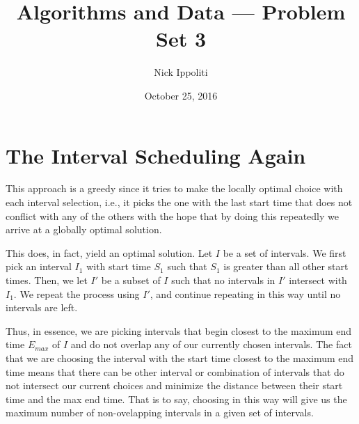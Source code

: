 \documentclass[14pt, letterpaper]{article}
\title{Algorithms and Data --- Problem Set 3}
\author{Nick Ippoliti}
\date{October 25, 2016}
\begin{document}
\begin{titlepage}
\maketitle
\end{titlepage}

\section{The Interval Scheduling Again}
This approach is a greedy since it tries to make the locally optimal choice
with each interval selection, i.e., it picks the one with the last start time
that does not conflict with any of the others with the hope that by doing this
repeatedly we arrive at a globally optimal solution.

This does, in fact, yield an optimal solution. Let $I$ be a set of intervals.
We first pick an interval $I_1$ with start time $S_1$ such that $S_1$ is 
greater than all other start times. Then, we let $I'$ be a subset of $I$ such
that no intervals in $I'$ intersect with $I_1$. We repeat the process using 
$I'$, and continue repeating in this way until no intervals are left.

Thus, in essence, we are picking intervals that begin closest to the maximum
end time $E_{max}$ of $I$ and do not overlap any of our currently chosen 
intervals. The fact that we are choosing the interval with the start time 
closest to the maximum end time means that there can be other interval or
combination of intervals that do not intersect our current choices and minimize
the distance between their start time and the max end time. That is to say,
choosing in this way will give us the maximum number of non-ovelapping 
intervals in a given set of intervals.
\end{document}
